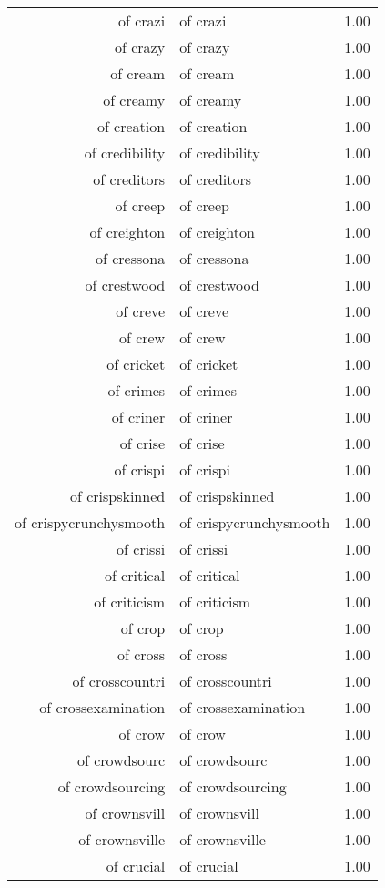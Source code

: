 \begin{table}[ht]
\begin{tabular}{rlr}
  of crazi & of crazi & 1.00 \\ 
  of crazy & of crazy & 1.00 \\ 
  of cream & of cream & 1.00 \\ 
  of creamy & of creamy & 1.00 \\ 
  of creation & of creation & 1.00 \\ 
  of credibility & of credibility & 1.00 \\ 
  of creditors & of creditors & 1.00 \\ 
  of creep & of creep & 1.00 \\ 
  of creighton & of creighton & 1.00 \\ 
  of cressona & of cressona & 1.00 \\ 
  of crestwood & of crestwood & 1.00 \\ 
  of creve & of creve & 1.00 \\ 
  of crew & of crew & 1.00 \\ 
  of cricket & of cricket & 1.00 \\ 
  of crimes & of crimes & 1.00 \\ 
  of criner & of criner & 1.00 \\ 
  of crise & of crise & 1.00 \\ 
  of crispi & of crispi & 1.00 \\ 
  of crispskinned & of crispskinned & 1.00 \\ 
  of crispycrunchysmooth & of crispycrunchysmooth & 1.00 \\ 
  of crissi & of crissi & 1.00 \\ 
  of critical & of critical & 1.00 \\ 
  of criticism & of criticism & 1.00 \\ 
  of crop & of crop & 1.00 \\ 
  of cross & of cross & 1.00 \\ 
  of crosscountri & of crosscountri & 1.00 \\ 
  of crossexamination & of crossexamination & 1.00 \\ 
  of crow & of crow & 1.00 \\ 
  of crowdsourc & of crowdsourc & 1.00 \\ 
  of crowdsourcing & of crowdsourcing & 1.00 \\ 
  of crownsvill & of crownsvill & 1.00 \\ 
  of crownsville & of crownsville & 1.00 \\ 
  of crucial & of crucial & 1.00 \\ 

\end{tabular}
\end{table}

